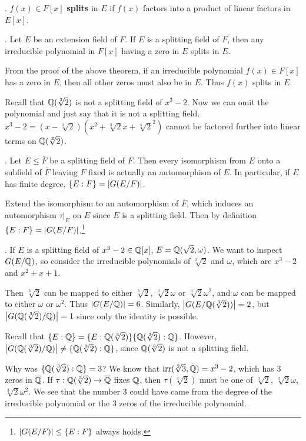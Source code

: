 . \(f(x) \in F[x]\) \textbf{splits} in \(E\) if \(f(x)\) factors into a product of linear factors in \(E[x]\).

\cor. Let \(E\) be an extension field of \(F\). If \(E\) is a splitting field of \(F\), then any irreducible polynomial in \(F[x]\) having a zero in \(E\) splits in \(E\).

\pf From the proof of the above theorem, if an irreducible polynomial \(f(x) \in F[x]\) has a zero in \(E\), then all other zeros must also be in \(E\). Thus \(f(x)\) splits in \(E\).

Recall that \(\mathbb{Q}(\sqrt[3]{2})\) is not a splitting field of \(x^3-2\). Now we can omit the polynomial and just say that it is not a splitting field. \(x^3 - 2 = (x - \sqrt[3]{2})(x^2 + \sqrt[3]{2}x + \sqrt[3]{2}^2)\) cannot be factored further into linear terms on \(\mathbb{Q}(\sqrt[3]{2})\).

\cor. Let \(E \leq \bar{F}\) be a splitting field of \(F\). Then every isomorphism from \(E\) onto a subfield of \(\bar{F}\) leaving \(F\) fixed is actually an automorphism of \(E\). In particular, if \(E\) has finite degree, \(\{E : F\} = \left| G(E/F) \right|\).

\pf Extend the isomorphism to an automorphism of \(\bar{F}\), which induces an automorphism \(\tau|_E\) on \(E\) since \(E\) is a splitting field. Then by definition \(\{E : F\} = \left| G(E/F) \right|\).\footnote{\(\left| G(E/F) \right| \leq \{E : F\}\) always holds.}

\ex. If \(E\) is a splitting field of \(x^3 - 2 \in \mathbb{Q}[x]\), \(E = \mathbb{Q}(\sqrt{2}, \omega)\). We want to inspect \(G(E/\mathbb{Q})\), so consider the irreducible polynomials of \(\sqrt[3]{2}\) and \(\omega\), which are \(x^3 - 2\) and \(x^2 + x + 1\).

Then \(\sqrt[3]{2}\) can be mapped to either \(\sqrt[3]{2}\), \(\sqrt[3]{2}\omega\) or \(\sqrt[3]{2}\omega^2\), and \(\omega\) can be mapped to either \(\omega\) or \(\omega^2\). Thus \(\left| G(E/\mathbb{Q}) \right| = 6\). Similarly, \(\left| G(E/\mathbb{Q}(\sqrt[3]{2})) \right| = 2\), but \(\left| G(\mathbb{Q}(\sqrt[3]{2})/\mathbb{Q}) \right| = 1\) since only the identity is possible.

Recall that \(\{E : \mathbb{Q}\} = \{E : \mathbb{Q}(\sqrt[3]{2})\} \{\mathbb{Q}(\sqrt[3]{2}) : \mathbb{Q}\}\). However, \(\left| G(\mathbb{Q}(\sqrt[3]{2})/\mathbb{Q}) \right| \neq \{\mathbb{Q}(\sqrt[3]{2}) : \mathbb{Q}\}\), since \(\mathbb{Q}(\sqrt[3]{2})\) is not a splitting field.

\rmk Why was \(\{\mathbb{Q}(\sqrt[3]{2}) : \mathbb{Q}\} = 3\)? We know that \(\mathrm{irr}(\sqrt[2]{3}, \mathbb{Q}) = x^3 - 2\), which has \(3\) zeros in \(\bar{\Q}\). If \(\tau : \Q(\sqrt[3]{2}) \ra \bar{\Q}\) fixes \(\mathbb{Q}\), then \(\tau(\sqrt[3]{2})\) must be one of \(\sqrt[3]{2}\), \(\sqrt[3]{2}\omega\), \(\sqrt[3]{2}\omega^2\). We see that the number \(3\) could have came from the degree of the irreducible polynomial or the \(3\) zeros of the irreducible polynomial.

